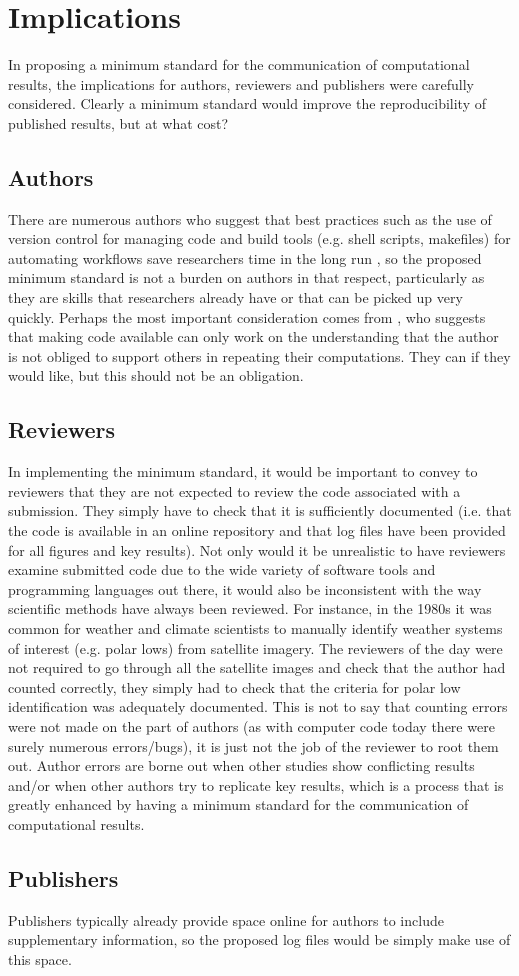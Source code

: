 \section{Implications}

In proposing a minimum standard for the communication of computational results, the implications for authors, reviewers and publishers were carefully considered. Clearly a minimum standard would improve the reproducibility of published results, but at what cost?

\subsection{Authors}

There are numerous authors who suggest that best practices such as the use of version control for managing code and build tools (e.g. shell scripts, makefiles) for automating workflows save researchers time in the long run \citep[e.g.][]{Sandve2013,Wilson2014a}, so the proposed minimum standard is not a burden on authors in that respect, particularly as they are skills that researchers already have or that can be picked up very quickly. Perhaps the most important consideration comes from \citet{Easterbrook2014}, who suggests that making code available can only work on the understanding that the author is not obliged to support others in repeating their computations. They can if they would like, but this should not be an obligation.

\subsection{Reviewers}

In implementing the minimum standard, it would be important to convey to reviewers that they are not expected to review the code associated with a submission. They simply have to check that it is sufficiently documented (i.e. that the code is available in an online repository and that log files have been provided for all figures and key results). Not only would it be unrealistic to have reviewers examine submitted code due to the wide variety of software tools and programming languages out there, it would also be inconsistent with the way scientific methods have always been reviewed. For instance, in the 1980s it was common for weather and climate scientists to manually identify weather systems of interest (e.g. polar lows) from satellite imagery. The reviewers of the day were not required to go through all the satellite images and check that the author had counted correctly, they simply had to check that the criteria for polar low identification was adequately documented. This is not to say that counting errors were not made on the part of authors (as with computer code today there were surely numerous errors/bugs), it is just not the job of the reviewer to root them out. Author errors are borne out when other studies show conflicting results and/or when other authors try to replicate key results, which is a process that is greatly enhanced by having a minimum standard for the communication of computational results.

\subsection{Publishers}

Publishers typically already provide space online for authors to include supplementary information, so the proposed log files would be simply make use of this space. 